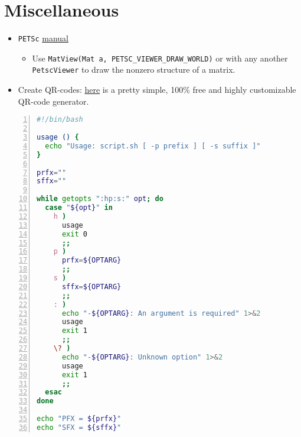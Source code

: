 \documentclass[a4paper,12pt,%
              final%
              ]{article}
\begin{document}
\section{Miscellaneous}
\label{sec:misc}
\begin{itemize}
  \item \texttt{PETSc} \href{https://www.mcs.anl.gov/petsc/petsc-current/docs/manual.pdf}{manual}
    \begin{itemize}
      \item Use \verb|MatView(Mat a, PETSC_VIEWER_DRAW_WORLD)| or with any another \texttt{PetscViewer} to draw the nonzero structure of a matrix.
    \end{itemize}
  \item Create QR-codes: \href{https://www.qrcode-monkey.com/}{here} is a pretty simple, 100\% free and highly customizable QR-code generator.
\end{itemize}

\appendix
\begin{lstlisting}[language=bash,numbers=left,float,frame=single,caption={script.sh, an example for \texttt{getopts}},label={lst:getopt_ex},numberfirstline=true,stepnumber=5,firstnumber=1]
#!/bin/bash

usage () {
  echo "Usage: script.sh [ -p prefix ] [ -s suffix ]"
}

prfx=""
sffx=""

while getopts ":hp:s:" opt; do
  case "${opt}" in
    h )
      usage
      exit 0
      ;;
    p )
      prfx=${OPTARG}
      ;;
    s )
      sffx=${OPTARG}
      ;;
    : )
      echo "-${OPTARG}: An argument is required" 1>&2
      usage
      exit 1
      ;;
    \? )
      echo "-${OPTARG}: Unknown option" 1>&2
      usage
      exit 1
      ;;
  esac
done

echo "PFX = ${prfx}"
echo "SFX = ${sffx}"
\end{lstlisting}
\end{document}
